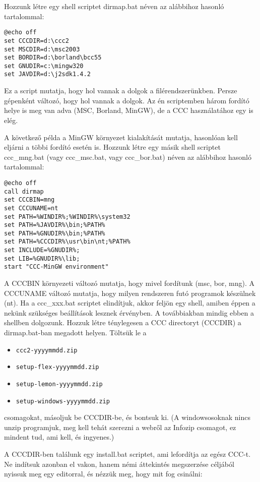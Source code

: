 Hozzunk létre egy shell scriptet dirmap.bat néven az alábbihoz
hasonló tartalommal:
\begin{verbatim}
@echo off
set CCCDIR=d:\ccc2
set MSCDIR=d:\msc2003
set BORDIR=d:\borland\bcc55
set GNUDIR=c:\mingw320
set JAVDIR=d:\j2sdk1.4.2
\end{verbatim}
Ez a script mutatja, hogy hol vannak a dolgok a filérendszerünkben. 
Persze gépenként változó, hogy hol vannak a dolgok.
Az én scriptemben három fordító helye is meg van adva (MSC, Borland, MinGW),
de a CCC használatához egy is elég. 

A következő példa a MinGW környezet kialakítását mutatja,
hasonlóan kell eljárni a többi fordító esetén is.
Hozzunk létre egy másik shell scriptet ccc\_mng.bat 
(vagy ccc\_msc.bat, vagy ccc\_bor.bat) néven az alábbihoz
hasonló tartalommal:
\begin{verbatim}
@echo off
call dirmap
set CCCBIN=mng
set CCCUNAME=nt
set PATH=%WINDIR%;%WINDIR%\system32
set PATH=%JAVDIR%\bin;%PATH%
set PATH=%GNUDIR%\bin;%PATH%
set PATH=%CCCDIR%\usr\bin\nt;%PATH%
set INCLUDE=%GNUDIR%;
set LIB=%GNUDIR%\lib;
start "CCC-MinGW environment"
\end{verbatim}

A CCCBIN környezeti változó mutatja, hogy mivel fordítunk (msc, bor, mng).
A CCCUNAME változó mutatja, hogy milyen rendszeren futó programok készülnek (nt).
Ha a ccc\_xxx.bat scriptet elindítjuk, akkor feljön egy shell,
amiben éppen a nekünk szükséges beállítások lesznek érvényben.
A továbbiakban mindig ebben a shellben dolgozunk.
Hozzuk létre ténylegesen a CCC directoryt (CCCDIR) a dirmap.bat-ban 
megadott helyen. Töltsük le a 
\begin{itemize}
\item \tt ccc2-yyyymmdd.zip
\item \tt setup-flex-yyyymmdd.zip
\item \tt setup-lemon-yyyymmdd.zip
\item \tt setup-windows-yyyymmdd.zip
\end{itemize}
csomagokat, másoljuk be CCCDIR-be, és bontsuk ki. (A windowsosoknak 
nincs unzip programjuk, meg kell tehát szerezni a webről az Infozip 
csomagot, ez mindent tud, ami kell, és ingyenes.) 

A CCCDIR-ben találunk egy install.bat scriptet, ami lefordítja
az egész CCC-t. Ne indítsuk azonban el vakon, hanem némi áttekintés
megszerzése céljából nyissuk meg egy editorral, és nézzük meg, 
hogy mit fog csinálni:
 

